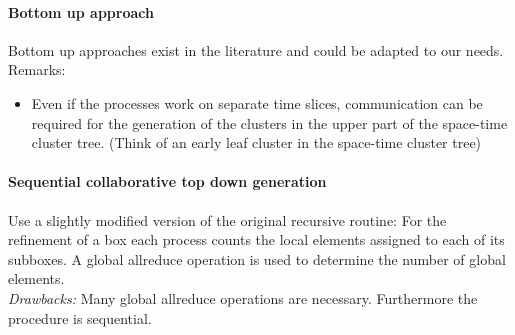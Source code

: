 \documentclass[a4paper,11pt]{article}
\theoremstyle{plain}
\theoremstyle{definition}
\theoremstyle{remark}
\begin{document}
\paragraph{Bottom up approach}
Bottom up approaches exist in the literature and could be adapted to our needs. Remarks:
\begin{itemize}
  \item Even if the processes work on separate time slices, communication can be required for the generation of the clusters in the upper part of the space-time cluster tree. (Think of an early leaf cluster in the space-time cluster tree)
\end{itemize}


\paragraph{Sequential collaborative top down generation}
Use a slightly modified version of the original recursive routine: For the refinement of a box each process counts the local elements assigned to each of its subboxes. A global allreduce operation is used to determine the number of global elements. \\
\textit{Drawbacks:} Many global allreduce operations are necessary. Furthermore the procedure is sequential.
\end{document}
